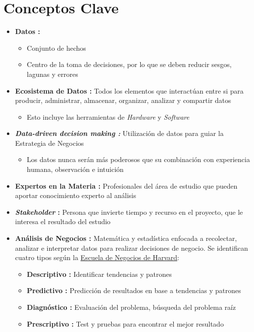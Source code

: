 \section{Conceptos Clave}
\begin{itemize}
    \item {\textbf{Datos : }
    \begin{itemize}
        \item {Conjunto de hechos}
        \item {Centro de la toma de decisiones, por lo que se deben reducir sesgos, lagunas y errores}
    \end{itemize}}
    \item {\textbf{Ecosistema de Datos : }Todos los elementos que interactúan entre si para producir, administrar, almacenar, organizar, analizar y compartir datos
    \begin{itemize}
        \item {Esto incluye las herramientas de \textit{Hardware} y \textit{Software}}
    \end{itemize}}
    \item {\textbf{\textit{Data-driven decision making : }}Utilización de datos para guiar la Estrategia de Negocios 
    \begin{itemize}
        \item {Los datos nunca serán más poderosos que su combinación con experiencia humana, observación e intuición}
    \end{itemize}}
    \item {\textbf{Expertos en la Materia : }Profesionales del área de estudio que pueden aportar conocimiento experto al análisis}
    \item {\textbf{\textit{Stakeholder} : }Persona que invierte tiempo y recurso en el proyecto, que le interesa el resultado del estudio}
    \item {\textbf{Análisis de Negocios : }Matemática y estadística enfocada a recolectar, analizar e interpretar datos para realizar decisiones de negocio. Se identifican cuatro tipos según la \href{https://online.hbs.edu/blog/post/business-analytics-examples}{Escuela de Negocios de Harvard}:
    \begin{itemize}
        \item {\textbf{Descriptivo : }Identificar tendencias y patrones}
        \item {\textbf{Predictivo : }Predicción de resultados en base a tendencias y patrones}
        \item {\textbf{Diagnóstico : }Evaluación del problema, búsqueda del problema raíz}
        \item {\textbf{Prescriptivo : }Test y pruebas para encontrar el mejor resultado}
    \end{itemize}}
    

\end{itemize}
